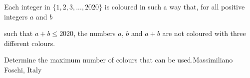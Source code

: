Each integer in $\{1, 2, 3, . . . , 2020\}$ is coloured in such a way that, for all positive integers $a$ and $b$

such that $a + b \leq 2020$,  the numbers $a$,  $b$ and $a + b$ are not coloured with three different colours.

Determine the maximum number of colours that can be used.Massimiliano Foschi, Italy